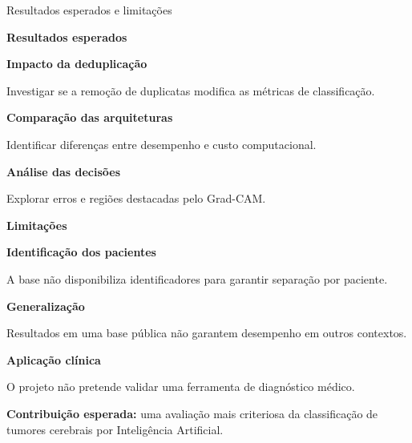 \documentclass[aspectratio=169,11pt,t]{beamer}
\def\kickertext{}
\newcommand{\kicker}[1]{\gdef\kickertext{#1}}
\newcommand{\cardtitle}[2][teal]{{\color{#1}\bfseries #2}\par\vspace{0.5mm}}
\begin{document}
\kicker{05\enspace PERSPECTIVAS}
\begin{frame}{Resultados esperados e limitações}
\vspace{0.5mm}
\begin{tcbraster}[raster columns=2,raster equal height,raster column skip=4mm]
\begin{tcolorbox}[card,topstripe=teal,fontupper=\footnotesize\color{navy}]
\cardtitle{Resultados esperados}
\textbf{Impacto da deduplicação}\par
Investigar se a remoção de duplicatas modifica as métricas de classificação.\par\vspace{0.7mm}
\textbf{Comparação das arquiteturas}\par
Identificar diferenças entre desempenho e custo computacional.\par\vspace{0.7mm}
\textbf{Análise das decisões}\par
Explorar erros e regiões destacadas pelo Grad-CAM.
\end{tcolorbox}
\begin{tcolorbox}[card,topstripe=amber,fontupper=\footnotesize\color{navy}]
\cardtitle[amber]{Limitações}
\textbf{Identificação dos pacientes}\par
A base não disponibiliza identificadores para garantir separação por paciente.\par\vspace{0.7mm}
\textbf{Generalização}\par
Resultados em uma base pública não garantem desempenho em outros contextos.\par\vspace{0.7mm}
\textbf{Aplicação clínica}\par
O projeto não pretende validar uma ferramenta de diagnóstico médico.
\end{tcolorbox}
\end{tcbraster}
\vspace{1.5mm}
\begin{tcolorbox}[tint,top=1.6mm,bottom=1.6mm]
\textbf{Contribuição esperada:} uma avaliação mais criteriosa da classificação de tumores cerebrais por Inteligência Artificial.
\end{tcolorbox}
\end{frame}
\end{document}

